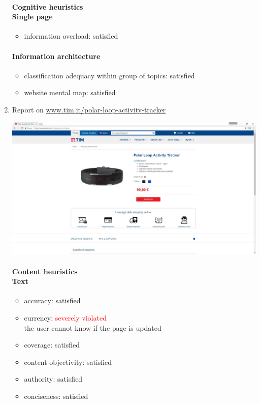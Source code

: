 \begin{enumerate}
	\paragraph*{Cognitive heuristics \\ Single page}
	\begin{itemize}
		\item information overload: satisfied
	\end{itemize}	
	
	\paragraph*{Information architecture}
	\begin{itemize}
		\item classification adequacy within group of topics: satisfied
		\item website mental map: satisfied
	\end{itemize}


\item Report on \url{www.tim.it/polar-loop-activity-tracker}

\begin{center}
	\includegraphics[width=\textwidth]{Screenshot/loop.jpg}
\end{center}
\vspace{1cm}

	\paragraph*{Content heuristics \\ Text}
	\begin{itemize}
		\item accuracy: satisfied
		\item currency: \textcolor{red}{severely violated}\\
		the user cannot know if the page is updated
		\item coverage: satisfied
		\item content objectivity: satisfied
		\item authority: satisfied
		\item conciseness: satisfied		
	\end{itemize}
	

\end{enumerate}
